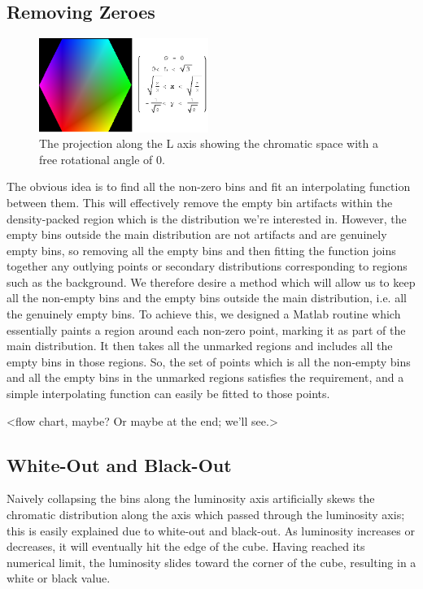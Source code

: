 \subsection{Removing Zeroes}\label{sec:RemovingZeroes}

\begin{figure}[h!]
  \caption{The projection along the L axis showing the chromatic space with a free rotational angle of 0.}
  \label{fig:xyPolygon}
  \centering
    \includegraphics[width=0.49\textwidth]{Chapter2/Figs/xy_Polygon.eps}
\end{figure}

The obvious idea is to find all the non-zero bins and fit an interpolating function between them. This will effectively remove the empty bin artifacts within the density-packed region which is the distribution we're interested in. However, the empty bins outside the main distribution are not artifacts and are genuinely empty bins, so removing all the empty bins and then fitting the function joins together any outlying points or secondary distributions corresponding to regions such as the background. We therefore desire a method which will allow us to keep all the non-empty bins and the empty bins outside the main distribution, i.e. all the genuinely empty bins. To achieve this, we designed a Matlab routine which essentially paints a region around each non-zero point, marking it as part of the main distribution. It then takes all the unmarked regions and includes all the empty bins in those regions. So, the set of points which is all the non-empty bins and all the empty bins in the unmarked regions satisfies the requirement, and a simple interpolating function can easily be fitted to those points.

<flow chart, maybe? Or maybe at the end; we'll see.>

\subsection{White-Out and Black-Out}\label{sec:WhiteOutBlackOut}

Naively collapsing the bins along the luminosity axis artificially skews the chromatic distribution along the axis which passed through the luminosity axis; this is easily explained due to white-out and black-out. As luminosity increases or decreases, it will eventually hit the edge of the cube. Having reached its numerical limit, the luminosity slides toward the corner of the cube, resulting in a white or black value.

